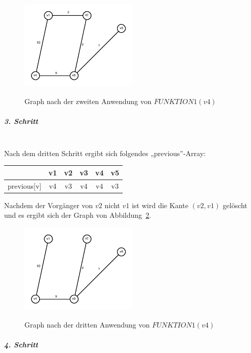\documentclass[a4paper, 12pt]{article}
\begin{document}
\begin{figure}[htbp]
	\caption{Graph nach der zweiten Anwendung von $FUNKTION1(v4)$}
	\vskip 0.2cm
	\centering
	\includegraphics[width=0.5\textwidth]{Figures/Test_2011-01-14-3A_Step2}
	\label{figure:Test_2011-01-14-3A_Step2}
\end{figure}

\subparagraph{3. Schritt}~\\

Nach dem dritten Schritt ergibt sich folgendes „previous”-Array:

\begin{center}
	\begin{tabular}{lccccc}
					& v1	& v2	& v3	& v4	& v5\\
		\hline
		previous[v] & v4	& v3	& v4	& v4	& v3
	\end{tabular}
\end{center}

Nachdem der Vorgänger von $v2$ nicht $v1$ ist wird die Kante $(v2,v1)$
gelöscht und es ergibt sich der Graph von
Abbildung~\ref{figure:Test_2011-01-14-3A_Step3}.

\begin{figure}[htbp]
	\caption{Graph nach der dritten Anwendung von $FUNKTION1(v4)$}
	\vskip 0.2cm
	\centering
	\includegraphics[width=0.5\textwidth]{Figures/Test_2011-01-14-3A_Step3}
	\label{figure:Test_2011-01-14-3A_Step3}
\end{figure}

\subparagraph{4. Schritt}~\\
\end{document}
